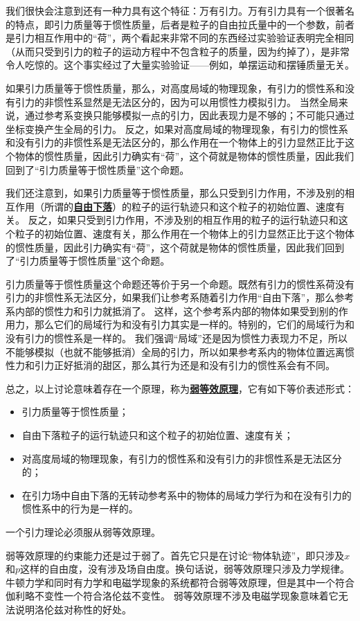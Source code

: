 \documentclass[hyperref, UTF8, a4paper]{ctexart}
\newcommand*{\concept}[1]{\underline{\textbf{#1}}}
\begin{document}
我们很快会注意到还有一种力具有这个特征：万有引力。万有引力具有一个很著名的特点，即引力质量等于惯性质量，后者是粒子的自由拉氏量中的一个参数，前者是引力相互作用中的“荷”，两个看起来非常不同的东西经过实验验证表明完全相同（从而只受到引力的粒子的运动方程中不包含粒子的质量，因为约掉了），是非常令人吃惊的。这个事实经过了大量实验验证——例如，单摆运动和摆锤质量无关。

如果引力质量等于惯性质量，那么，对高度局域的物理现象，有引力的惯性系和没有引力的非惯性系显然是无法区分的，因为可以用惯性力模拟引力。
当然全局来说，通过参考系变换只能够模拟一点的引力，因此表现力是不够的；不可能只通过坐标变换产生全局的引力。
反之，如果对高度局域的物理现象，有引力的惯性系和没有引力的非惯性系是无法区分的，那么作用在一个物体上的引力显然正比于这个物体的惯性质量，因此引力确实有“荷”，这个荷就是物体的惯性质量，因此我们回到了“引力质量等于惯性质量”这个命题。

我们还注意到，如果引力质量等于惯性质量，那么只受到引力作用，不涉及别的相互作用（所谓的\concept{自由下落}）的粒子的运行轨迹只和这个粒子的初始位置、速度有关。
反之，如果只受到引力作用，不涉及别的相互作用的粒子的运行轨迹只和这个粒子的初始位置、速度有关，那么作用在一个物体上的引力显然正比于这个物体的惯性质量，因此引力确实有“荷”，这个荷就是物体的惯性质量，因此我们回到了“引力质量等于惯性质量”这个命题。

引力质量等于惯性质量这个命题还等价于另一个命题。既然有引力的惯性系荷没有引力的非惯性系无法区分，如果我们让参考系随着引力作用“自由下落”，那么参考系内部的惯性力和引力就抵消了。
这样，这个参考系内部的物体如果受到别的作用力，那么它们的局域行为和没有引力其实是一样的。特别的，它们的局域行为和没有引力的惯性系是一样的。
我们强调“局域”还是因为惯性力表现力不足，所以不能够模拟（也就不能够抵消）全局的引力，所以如果参考系内的物体位置远离惯性力和引力正好抵消的甜区，那么其行为还是和没有引力的惯性系会有不同。

总之，以上讨论意味着存在一个原理，称为\concept{弱等效原理}，它有如下等价表述形式：
\begin{itemize}
	\item 引力质量等于惯性质量；
	\item 自由下落粒子的运行轨迹只和这个粒子的初始位置、速度有关；
	\item 对高度局域的物理现象，有引力的惯性系和没有引力的非惯性系是无法区分的；
	\item 在引力场中自由下落的无转动参考系中的物体的局域力学行为和在没有引力的惯性系中的行为是一样的。
\end{itemize}
一个引力理论必须服从弱等效原理。

弱等效原理的约束能力还是过于弱了。首先它只是在讨论“物体轨迹”，即只涉及$x$和$p$这样的自由度，没有涉及场自由度。换句话说，弱等效原理只涉及力学规律。
牛顿力学和同时有力学和电磁学现象的系统都符合弱等效原理，但是其中一个符合伽利略不变性一个符合洛伦兹不变性。
弱等效原理不涉及电磁学现象意味着它无法说明洛伦兹对称性的好处。
\end{document}
